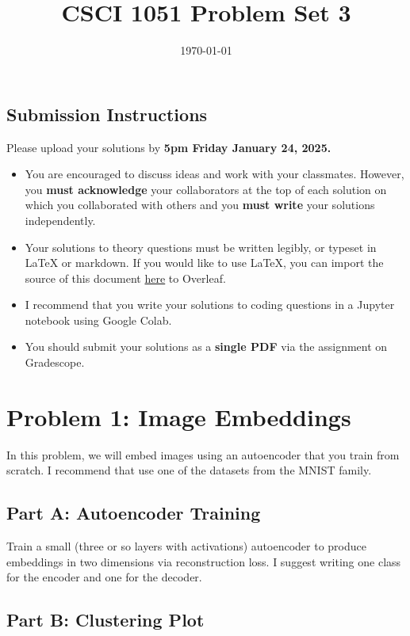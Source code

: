 \documentclass{article}
\title{CSCI 1051 Problem Set 3}
\author{} %
\date{\today}
\begin{document}
\maketitle

\subsection*{Submission Instructions}

Please upload your solutions by
\textbf{5pm Friday January 24, 2025.}
\begin{itemize}
\item You are encouraged to discuss ideas
and work with your classmates. However, you
\textbf{must acknowledge} your collaborators
at the top of each solution on which
you collaborated with others 
and you \textbf{must write} your solutions
independently.
\item Your solutions to theory questions must
be written legibly, or typeset in LaTeX or markdown.
If you would like to use LaTeX, you can import the source of this document 
\href{https://www.rtealwitter.com/deeplearning/psets/pset2.tex}{here}
to Overleaf.
\item I recommend that you write your solutions to coding questions in a Jupyter notebook using Google Colab.
\item You should submit your solutions as a \textbf{single PDF} via the assignment on Gradescope.
\end{itemize}

\newpage \section*{Problem 1: Image Embeddings}

In this problem, we will embed images using an autoencoder that you train from scratch.
I recommend that use one of the datasets from the MNIST family.

\subsection*{Part A: Autoencoder Training}

Train a small (three or so layers with activations) autoencoder to produce embeddings in two dimensions via reconstruction loss.
I suggest writing one class for the encoder and one for the decoder.

\subsection*{Part B: Clustering Plot}
\end{document}
